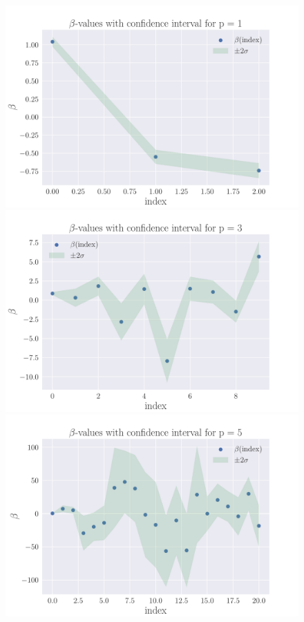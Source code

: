 \documentclass[reprint,english,notitlepage,aps,nobalancelastpage,nofootinbib]{revtex4-1}  %
\begin{document}
\begin{figure}[h]
	\includegraphics[width=\linewidth]{Var_OLS_poldeg_1.pdf}
	\endminipage\hfill
	\includegraphics[width=\linewidth]{Var_OLS_poldeg_3.pdf}
	\endminipage\hfill
	\includegraphics[width=\linewidth]{Var_OLS_poldeg_5.pdf}

\end{figure}
\end{document}
